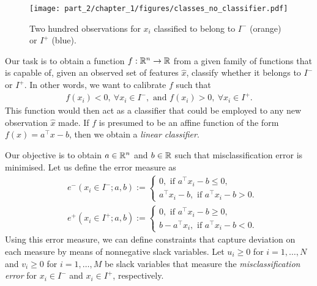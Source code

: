 \begin{figure}
    \texttt{[image: part\_2/chapter\_1/figures/classes\_no\_classifier.pdf]}
    \caption{Two hundred observations for $x_i$ classified to belong to $I^-$ (orange) or $I^+$ (blue).}        
    \label{fig:classified_observations}
\end{figure}

Our task is to obtain a function $f:\mathbb{R}^n \to \mathbb{R}$ from a given family of functions that is capable of, given an observed set of features $\hat{x}$, classify whether it belongs to $I^-$ or $I^+$. In other words, we want to calibrate $f$ such that
%
\begin{align}
	f(x_i) < 0, \ \forall x_i \in I^-, \text{ and } f(x_i) > 0, \ \forall x_i \in I^+.  
\end{align}
%
This function would then act as a classifier that could be employed to any new observation $\hat{x}$ made. If $f$ is presumed to be an affine function of the form $f(x) = a^\top x - b$, then we obtain a \emph{linear classifier}. 

Our objective is to obtain $a \in \mathbb{R}^n$ and $b \in \mathbb{R}$ such that misclassification error is minimised. Let us define the error measure as
%
\begin{align*}
& e^-(x_i \in I^-; a, b) := 
    \begin{cases} 0, \text{ if } a^\top x_i - b \leq 0, \\
        a^\top x_i - b, \text{ if } a^\top x_i - b > 0.
    \end{cases} \\
& e^+(x_i \in I^+; a, b) := 
    \begin{cases} 0, \text{ if } a^\top x_i - b \geq 0, \\
        b -  a^\top x_i, \text{ if } a^\top x_i - b < 0.
    \end{cases}                   
\end{align*}
%
Using this error measure, we can define constraints that capture deviation on each measure by means of nonnegative slack variables. Let $u_i \geq 0$ for $i = 1, \dots, N$ and $v_i \geq 0$ for $i = 1,\dots, M$ be slack variables that measure the \emph{misclassification error} for $x_i \in I^-$ and $x_i \in I^+$, respectively.

